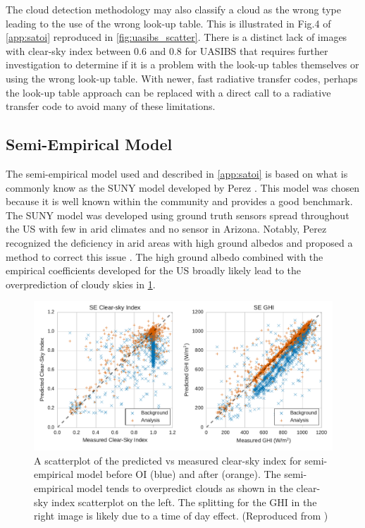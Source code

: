 The cloud detection methodology may also classify a cloud as the wrong
type leading to the use of the wrong look-up table.
This is illustrated in Fig.\@ 4 of \cref{app:satoi} reproduced in
\cref{fig:uasibs_scatter}.
There is a distinct lack of images with clear-sky index between 0.6
and 0.8 for UASIBS that requires further investigation to determine if
it is a problem with the look-up tables themselves or using the wrong
look-up table.
With newer, fast radiative transfer codes, perhaps the look-up table
approach can be replaced with a direct call to a radiative transfer
code to avoid many of these limitations.

\subsection{Semi-Empirical Model}
The semi-empirical model used and described in \cref{app:satoi} is
based on what is commonly know as the SUNY model developed by Perez
\etal \citep{Perez2002}.
This model was chosen because it is well known within the community
and provides a good benchmark.
The SUNY model was developed using ground truth sensors spread
throughout the US with few in arid climates and no sensor in Arizona.
Notably, Perez \etal recognized the deficiency in arid areas with high
ground albedos and proposed a method to correct this issue
\citep{Perez2004}.
The high ground albedo combined with the empirical coefficients
developed for the US broadly likely lead to the overprediction of
cloudy skies in \cref{fig:suny_scatter}.

\begin{figure}[h]
\centering
\includegraphics[width=\textwidth]{figs/suny_scatter.pdf}
\caption[Scatterplot of predicted vs measured clear-sky index for the
semi-empirical model]{A scatterplot of the predicted vs measured
  clear-sky index for semi-empirical model before OI (blue) and after
  (orange). The semi-empirical model tends to overpredict clouds as
  shown in the clear-sky index scatterplot on the left. The splitting
  for the GHI in the right image is likely due to a time of day
  effect.  (Reproduced from \cite{Lorenzo2017})}
\label{fig:suny_scatter}
\end{figure}


